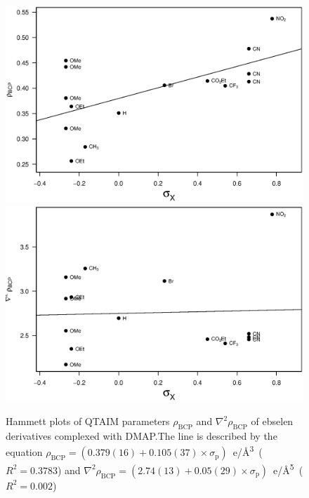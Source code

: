 \begin{refsection}
\begin{figure}
  \centering
  \includegraphics[width=0.45\linewidth]{Figures/hammett-rho-dmap.eps}
  \includegraphics[width=0.45\linewidth]{Figures/hammett-lapl-dmap.eps}
  \caption[Hammett plots of QTAIM parameters $\rho_\text{BCP}$ and $\nabla^2\rho_{\text{BCP}}$ of ebselen derivatives complexed with DMAP.]{Hammett plots of QTAIM parameters $\rho_\text{BCP}$ and $\nabla^2\rho_{\text{BCP}}$ of ebselen derivatives complexed with DMAP.\@ The line is described by the equation $\rho_{\text{BCP}} = (0.379(16) + 0.105(37) \times \sigma_\text{p})$~e/\AA\textsuperscript{3}~($R^2=0.3783$) and $\nabla^2\rho_{\text{BCP}} = (2.74(13) + 0.05(29) \times \sigma_\text{p})$~e/\AA\textsuperscript{5}~($R^2=0.002$)}\label{fig:hammett-qtaim-dmap}
\end{figure}


\end{refsection}
